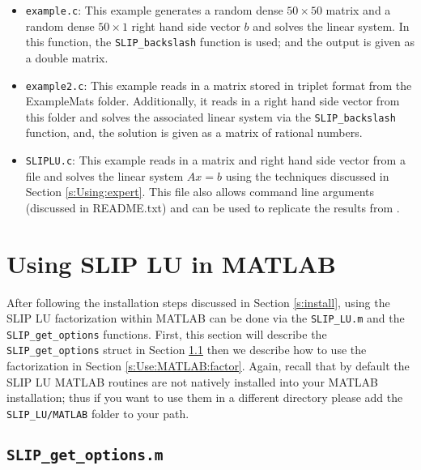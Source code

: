 \documentclass[12pt]{article}
\theoremstyle{definition}
\begin{document}
\begin{itemize}
\item \verb|example.c|: This example generates a random dense $50 \times 50$
matrix and a random dense $50 \times 1$ right hand side vector $b$ and
solves the linear system. In this function, the \verb|SLIP_backslash|
function is used; and the output is given as a double matrix.

\item \verb|example2.c|: This example reads in a matrix stored in triplet
format from the ExampleMats folder. Additionally, it reads in a
right hand side vector from this folder and solves the associated linear system
via the \verb|SLIP_backslash| function, and, the solution is given as a matrix
of rational numbers.

\item \verb|SLIPLU.c|: This example reads in a matrix and right hand side
vector from a file and solves the linear system $A x = b$
using the techniques discussed in Section \ref{s:Using:expert}. This file also
allows command line arguments (discussed in README.txt) and can be used to
replicate the results from \cite{lourenco2019exact}.

\end{itemize}

\cprotect\section{Using SLIP LU in MATLAB}
\label{s:Use:MATLAB}

After following the installation steps discussed in Section \ref{s:install},
using the SLIP LU factorization within MATLAB can be done via the
\verb|SLIP_LU.m| and the \verb|SLIP_get_options| functions. First, this section
will describe the \verb|SLIP_get_options| struct in Section
\ref{s:Use:MATLAB:setup} then we describe how to use the factorization in
Section \ref{s:Use:MATLAB:factor}. Again, recall that by default the SLIP LU
MATLAB routines are not natively installed into your MATLAB installation; thus
if you want to use them in a different directory please add the
\verb|SLIP_LU/MATLAB| folder to your path.

\cprotect\subsection{\verb|SLIP_get_options.m|}
\label{s:Use:MATLAB:setup}
\end{document}

